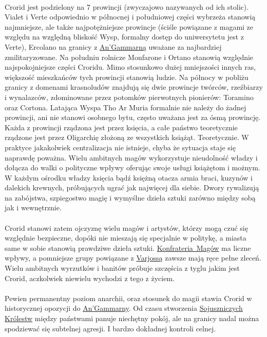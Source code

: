 \paragraph{}
Crorid jest podzielony na 7 prowincji (zwyczajowo nazywanych od ich stolic).
Vialet i Verte odpowiednio w północnej i południowej części wybrzeża stanowią najmniejsze, ale także najpotężniejsze prowincje (ściśle powiązane z magami ze względu na względną bliskość Wysp, formalny dostęp do uniwersytetu jest z Verte), Ercolano na granicy z \hyperref[AnGamarrna]{An'Gammarną} uważane za najbardziej zmilitaryzowane.
Na południu rolnicze Monfarone i Ortano stanowią względnie najspokojniejsze części Croridu.
Mimo stosunkowo dużej mniejszości innych ras, większość mieszkańców tych prowincji stanowią ludzie.
Na północy w pobliżu granicy z domenami krasnoludów znajdują się dwie prowincje twórców, rzeźbiarzy i wynalazców, zdominowane przez potomków pierwotnych pionierów: Toramino oraz Cortona.
Latająca Wyspa Tho Ar Muria formalnie nie należy do żadnej prowincji, ani nie stanowi osobnego bytu, często uważana jest za ósmą prowincję.
Każda z prowincji rządzona jest przez księcia, a całe państwo teoretycznie rządzone jest przez Oligarchię złożoną ze wszystkich książąt.
Teoretycznie.
W praktyce jakakolwiek centralizacja nie istnieje, chyba że sytuacja staje się naprawdę poważna.
Wielu ambitnych magów wykorzystuje nieudolność władzy i dołącza do walki o polityczne wpływy oferując swoje usługi książętom i możnym.
W każdym ośrodku władzy księcia bądź księżną otacza armia braci, kuzynów i dalekich krewnych, próbujących ugrać jak najwięcej dla siebie.
Dwory rywalizują na zabójstwa, szpiegostwo magię i wymyślne dzieła sztuki zarówno między sobą jak i wewnętrznie.

\paragraph{}
Crorid stanowi zatem ojczyznę wielu magów i artystów, którzy mogą czuć się względnie bezpieczne, dopóki nie mieszają się specjalnie w politykę, a miasta same w sobie stanowią prawdziwe dzieła sztuki.
\hyperref[KonfraterieMagow]{Konfrateria\ Magów} ma liczne wpływy, a pomniejsze grupy powiązane z \hyperref[Varjossa]{Varjossą} zawsze mają ręce pełne zleceń.
Wielu ambitnych wyrzutków i banitów próbuje szczęścia z tyglu jakim jest Crorid, aczkolwiek niewielu wychodzi z tego z życiem.

\paragraph{}
Pewien permanentny poziom anarchii, oraz stosunek do magii stawia Crorid w historycznej opozycji do \hyperref[AnGamarrna]{An'Gammarny}.
Od czasu stworzenia \hyperref[SojuszniceKrolestwa]{Sojuszniczych Królestw} między państwami panuje niechętny pokój, ale na granicy nadal można spodziewać się subtelnej agresji.
I bardzo dokładnej kontroli celnej.

